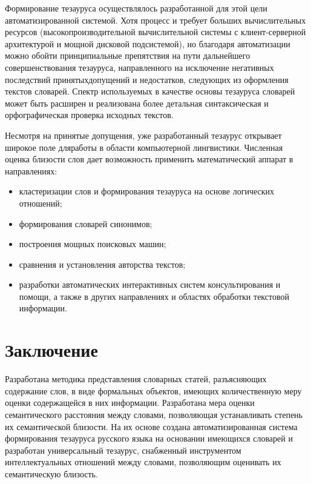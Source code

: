\begin{multicols}{2}
     Формирование тезауруса осуществлялось раз\-ра\-бо\-тан\-ной для этой цели 
автоматизированной \mbox{системой}. Хотя процесс и требует больших 
вычислительных ресурсов (высокопроизводительной вычислительной системы 
с кли\-ент-сер\-вер\-ной архитектурой и мощной дисковой подсистемой), но\linebreak 
благодаря автоматизации можно обойти принципиальные препятствия на пути 
дальнейшего совершенствования тезауруса, направленного на исключение 
негативных последствий принятых\linebreak допущений и недостатков, следующих из 
оформления текстов словарей. Спектр используемых в качестве основы 
тезауруса словарей может быть расширен и реализована более детальная 
синтаксическая и орфографическая проверка исходных текстов.
     
     Несмотря на принятые допущения, уже разра\-ботанный тезаурус 
открывает широкое поле для\linebreak работы в области компьютерной лингвистики. 
Чис\-лен\-ная оценка близости слов дает возможность применить математический 
аппарат в на\-прав\-ле\-ниях:
     \begin{itemize}
\item кластеризации слов и формирования тезауруса на основе логических 
отношений;
\item формирования словарей синонимов;
\item построения мощных поисковых машин;
\item сравнения и установления авторства текстов;
\item разработки автоматических интерактивных сис\-тем консультирования и 
помощи, а также в других направлениях и областях обработки текстовой 
информации. 
\end{itemize}
     

\section{Заключение}

     Разработана методика представления словарных статей, разъясняющих 
содержание слов, в виде формальных объектов, имеющих количественную 
меру оценки содержащейся в них информации. Разработана мера оценки 
семантического расстояния между словами, позволяющая устанавливать 
степень их семантической близости. На их основе создана автоматизированная 
система формирования тезауруса русского языка на основании имеющихся 
словарей и разработан универсальный тезаурус, снабженный инструментом 
интеллектуальных отношений между словами, позволяющим оценивать их 
семантическую близость. 


\end{multicols}
